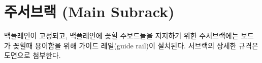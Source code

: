 \section{주서브랙 (Main Subrack)}
백플레인이 고정되고, 백플레인에 꽂힐 주보드들을 지지하기 위한 주서브랙에는
보드가 꽂힐때 용이함을 위해 가이드 레일(guide rail)이 설치된다.
서브랙의 상세한 규격은 도면으로 첨부한다.
%
